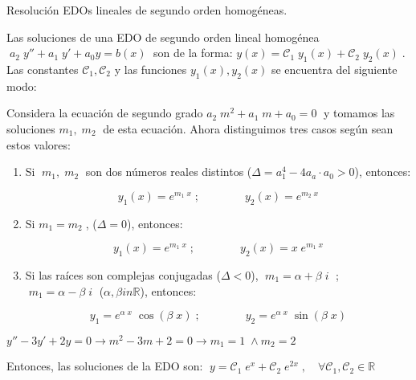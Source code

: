 \begin{cuadro-naranja}
\begin{teor}{Resolución EDOs lineales de segundo orden homogéneas.}

Las soluciones de una EDO de segundo orden lineal homogénea $\; a_2\; y'' + a_1	\; y' + a_0 y= b(x) \;$ son de la forma: $y(x)=\mathcal{C}_1\; y_1(x)+\mathcal{C}_2\; y_2(x)\;$. Las constantes $\mathcal{C}_1, \mathcal{C}_2$ y las funciones $y_1(x), y_2(x)$ se encuentra del siguiente modo:

Considera la ecuación de segundo grado \; $a_2\;  m^2 + a_1 \; m + a_0=0\; $ y tomamos las soluciones \; $m_1,\;  m_2\; $ de esta ecuación. Ahora distinguimos tres casos según sean estos valores:

\begin{enumerate}

\item  Si $\; m_1,\; m_2\; $	son dos números reales distintos ($\Delta=a_1^4-4a_a\cdot a_0>0$), entonces:

\begin{equation*}
	y_1(x)=e^{m_1\; x} \; ;  \qquad  \qquad y_2(x)=e^{m_2\; x}
\end{equation*}

\item Si $m_1=m_2\; $,  ($\Delta=0$), entonces:

\begin{equation*}
	y_1(x)=e^{m_1\; x} \; ;  \qquad  \qquad y_2(x)=x\; e^{m_1\; x}
\end{equation*}

\item Si las raíces son complejas conjugadas ($\Delta<0$), 
$\; m_1=\alpha + \beta \; i\; $ ; $\; m_1=\alpha - \beta \; i\; $ ($\alpha, \beta in \mathbb R$), entonces:

\begin{equation*}
	y_1=e^{\alpha\; x}\; \cos (\beta\; x) \; ;  \qquad  \qquad y_2=e^{\alpha\; x}\; \sin (\beta\; x)
\end{equation*}
\end{enumerate}
\end{teor}
\end{cuadro-naranja}

\vspace{4mm}

\begin{cuadro-gris}
\begin{ejem}
$y''-3y'+2y=0 \to m^2-3m+2=0 \to m_1=1 \; \wedge m_2=2\; $

Entonces, las soluciones de la EDO son: $\; y=\mathcal{C}_1\; e^x +\mathcal{C}_2\; e^{2x}\; , \quad \forall \mathcal{C}_1,\mathcal{C}_2 \in \mathbb R$  	
\end{ejem}
\end{cuadro-gris}

